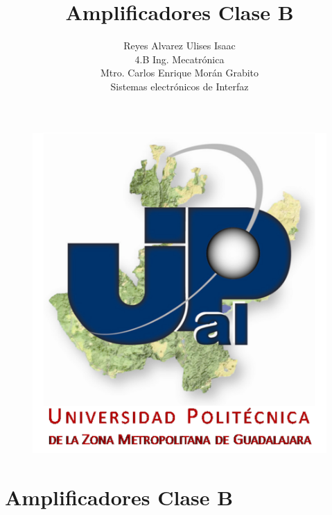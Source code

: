 \documentclass[12pt,a4paper]{article}
\author{Reyes Alvarez Ulises Isaac\\4.B  Ing. Mecatrónica\\Mtro. Carlos Enrique Morán Grabito\\ Sistemas electrónicos de Interfaz}
\title{Amplificadores Clase B}
\begin{document}
\maketitle
\begin{figure}[hbtp]
\centering
\includegraphics[scale=1.7]{Pictures/Universidad.png}
\end{figure}

\newpage
\section*{Amplificadores Clase B}
\end{document}
